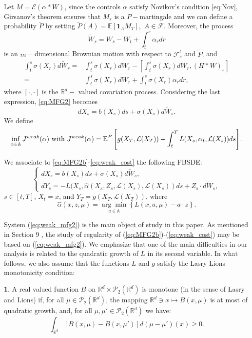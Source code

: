 \documentclass[12,english]{amsart}
\theoremstyle{plain}
\theoremstyle{definition}
\newtheorem{defn}{\protect\definitionname}
\theoremstyle{plain}
\theoremstyle{plain}
\theoremstyle{remark}
\providecommand{\definitionname}{Definition}
\newcommand{\A}{\mathbb A}
\newcommand{\E}{\mathbb E}
\newcommand{\R}{\mathbb R}
\newcommand{\cE}{\mathcal E}
\newcommand{\cF}{\mathcal F}
\newcommand{\cL}{\mathcal L}
\newcommand{\cP}{\mathcal P}
\newcommand{\af}{\alpha}
\newcommand{\si}{\sigma}
\begin{document}
Let $M=\cE(\af\ast W)$,
since the controls $\alpha$ satisfy Novikov's condition \eqref{eq:Nov}, 
Girsanov's theorem ensures that $M_s$ is a $P-$martingale and 
we can define a probability $\tilde{P}$ by setting $\tilde{P}(A)=\E\left[\mathbf1_{A}M_T\right],$
$A\in\cF$. Moreover, the process 
\[
\tilde{W}_s=W_s-W_t+\int_t^s\alpha_rdr 
\]
is an $m-$dimensional Brownian motion with respect to $\cF_s^t$
and $\tilde{P}$, and 
\begin{align*}
\int_t^s\si(X_r)d\tilde{W}_r= & \int_t^s\si(X_r)dW_r-\left[\int_t^s\si(X_r)dW_r, (H\ast W)_s\right]\\
= & \int_t^s\si(X_r)dW_r+\int_t^s\si(X_r)\alpha_rdr, 
\end{align*}
where $\left[\cdot,\cdot\right]$ is the $\R^d-$ valued 
covariation process. Considering the last expression, \eqref{eq:MFG2}
becomes 
\begin{equation}
dX_s=b(X_s)ds+\si(X_s)d\tilde{W}_s.\label{eq:MFG2b}
\end{equation}
We define 
\begin{equation}
\inf_{\af\in\A}J^{weak}(\alpha)\hbox{ with }J^{weak}(\alpha)=\E^{\tilde{P}}\left[g(X_T,\cL(X_T))+\int_t^TL(X_s,\alpha_t,\cL(X_s))ds\right].\label{eq:weak_cost}
\end{equation}

We associate to \eqref{eq:MFG2b}-\eqref{eq:weak_cost} 
the following FBSDE: 
\begin{equation}
\begin{cases}
dX_s=b(X_s)ds+\si(X_s)d\tilde{W}_s,\\
dY_s=-L(X_s,\hat{\alpha}(X_s,Z_s, \cL(X_s),\cL(X_s))ds+Z_s\cdot d\tilde{W}_s, 
\end{cases}\label{eq:weak_mfg2}
\end{equation}
$s\in\left[t,T\right]$, $X_t=x$, and $Y_T=g(X_T,\cL(X_T))$,  where 
\[
\hat{\alpha}(x,z,\mu)=\underset{a\in\mathbb A}{\arg\min}\left\{ L(x,a,\mu)-a\cdot z\right\}. 
\]

System (\ref{eq:weak_mfg2}) is the main object of study in this paper. As mentioned in Section 9 \cite{carmona2015probabilistic}, the study of regularity of (\ref{eq:MFG2b})-(\ref{eq:weak_cost}) may be based on (\ref{eq:weak_mfg2}). We emphasize that one of the main difficulties in our
analysis is related to the quadratic growth of $L$ in its second
variable. In what follows, we also assume that the functions $L$ and $g$ satisfy the Lasry-Lions monotonicity condition:
\begin{defn}\label{Lions}
A real valued function $B$ on $\R^d\times\cP_2(\R^d)$
is monotone (in the sense of Lasry and Lions) if, for all $\mu\in\cP_2(\R^d)$,
the mapping $\R^d\ni x\mapsto B(x,\mu)$ is at
most of quadratic growth, and, for all $\mu,\mu'\in\cP_2(\R^d)$
we have:
\[
\int_{\R^d}\left[B(x,\mu)-B(x,\mu')\right]d(\mu-\mu')(x)\geq0.
\]
\end{defn}
\end{document}
